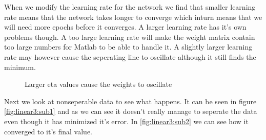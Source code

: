 \documentclass[a4paper,11pt]{article}
\begin{document}
When we modify the learning rate for the network we find that smaller learning rate means that the network takes longer to converge which inturn means that we will need more epochs before it converges. A larger learning rate has it's own problems though. A too large learning rate will make the weight matrix contain too large numbers for Matlab to be able to handle it. A slightly larger learning rate may however cause the seperating line to oscillate although it still finds the minimum.

\begin{figure}[h!]
\caption{Larger eta values cause the weights to oscillate}
\end{figure}

Next we look at nonseperable data to see what happens. It can be seen in figure \ref{fig:linear3:sub1} and as we can see it doesn't really manage to seperate the data even though it has minimized it's error. In \ref{fig:linear3:sub2} we can see how it converged to it's final value.
\end{document}
